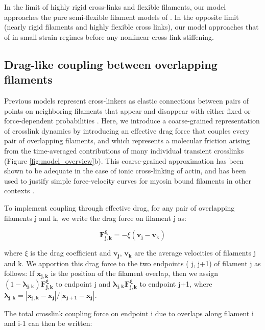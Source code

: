 \documentclass[10pt,letterpaper]{article}
\begin{document}
In the limit of highly rigid cross-links and flexible filaments, our model approaches the pure semi-flexible filament models of \cite{theo_hlm,theo_hlm2}. In the opposite limit (nearly rigid filaments and highly flexible cross links), our model approaches that of \cite{theo_crosslinknonlinear} in small strain regimes before any nonlinear cross link stiffening. 

\subsection*{Drag-like coupling between overlapping filaments}
\label{exp_drag}
Previous models represent cross-linkers as elastic connections between pairs of points on neighboring filaments that appear and disappear with either fixed or force-dependent probabilities \cite{model_taeyoon,theo_crosslinknonlinear}.  Here, we introduce a coarse-grained representation of crosslink dynamics by introducing an effective drag force that couples every pair of overlapping filaments, and which represents a molecular friction arising from the time-averaged contributions of many individual transient crosslinks (Figure \ref{fig:model_overview}b). This coarse-grained approximation has been shown to be adequate in the case of ionic cross-linking of actin\cite{mol_fric,theo_hydroish2}, and has been used to justify simple force-velocity curves for myosin bound filaments in other contexts \cite{theo_frictionShila}. 

To implement coupling through effective drag, for any pair of overlapping filaments j and k, we write the drag force on filament j as:

\begin{equation}
\label{eqn:drag force}
\mathbf{F^{\xi}_{j,k}} = -\xi  (\mathbf{v_{j}}-\mathbf{v_{k}}) 
\end{equation}

where $\xi$ is the drag coefficient and $\mathbf{v_{j}}$, $\mathbf{v_{k}}$ are the average velocities of filaments j and k. We apportion this drag force to the two endpoints ( j, j+1) of filament j as follows: If $\mathbf{x_{j,k}}$ is the position of the filament overlap, then we assign $(1 - \mathbf{\lambda_{j,k}}) \mathbf{F^{\xi}_{j,k}}$ to endpoint j and $\mathbf{\lambda_{j,k}} \mathbf{F^{\xi}_{j,k}}$ to endpoint j+1, where $\mathbf{\lambda_{j,k}} = |\mathbf{x_{j,k}}-\mathbf{x_j}|/|\mathbf{x_{j+1}}-\mathbf{x_j}|$.

The total crosslink coupling force on endpoint i due to overlaps along filament i and i-1 can then be written:
\end{document}
